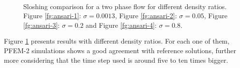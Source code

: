   \begin{figure}[h]
  \centering
     \\
   \caption{Sloshing comparison for a two phase flow for different density ratios. Figure \ref{fg:ansari-1}: $\sigma=0.0013$, Figure \ref{fg:ansari-2}: $\sigma=0.05$, Figure \ref{fg:ansari-3}: $\sigma=0.2$ and Figure \ref{fg:ansari-4}: $\sigma=0.8$.
}
   \label{fg:ansari-results}                %
\end{figure}

Figure \ref{fg:ansari-results} presents results with different density ratios. For each one of them, PFEM-2 simulations shows a good agreement with reference solutions, further more considering that the time step used is around five to ten times bigger.
\clearpage

